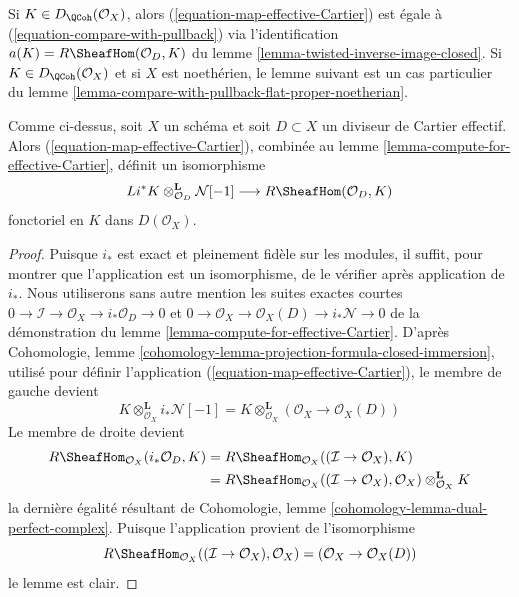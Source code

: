 \medskip\noindent
Si $K \in D_\QCoh(\mathcal{O}_X)$, alors (\ref{equation-map-effective-Cartier}) est égale à (\ref{equation-compare-with-pullback}) via l'identification $a(K) = R\SheafHom(\mathcal{O}_D, K)$ du lemme \ref{lemma-twisted-inverse-image-closed}. Si $K \in D_\QCoh(\mathcal{O}_X)$ et si $X$ est noethérien, le lemme suivant est un cas particulier du lemme \ref{lemma-compare-with-pullback-flat-proper-noetherian}.

\begin{lemma}
\label{lemma-sheaf-with-exact-support-effective-Cartier}
Comme ci-dessus, soit $X$ un schéma et soit $D \subset X$ un diviseur de Cartier effectif. Alors (\ref{equation-map-effective-Cartier}), combinée au lemme \ref{lemma-compute-for-effective-Cartier}, définit un isomorphisme
$$
Li^*K \otimes_{\mathcal{O}_D}^\mathbf{L} \mathcal{N}[-1]
\longrightarrow
R\SheafHom(\mathcal{O}_D, K)
$$
fonctoriel en $K$ dans $D(\mathcal{O}_X)$.
\end{lemma}

\begin{proof}
Puisque $i_*$ est exact et pleinement fidèle sur les modules, il suffit, pour montrer que l'application est un isomorphisme, de le vérifier après application de $i_*$. Nous utiliserons sans autre mention les suites exactes courtes
$0 \to \mathcal{I} \to \mathcal{O}_X \to i_*\mathcal{O}_D \to 0$
et
$0 \to \mathcal{O}_X \to \mathcal{O}_X(D) \to i_*\mathcal{N} \to 0$
de la démonstration du lemme \ref{lemma-compute-for-effective-Cartier}. D'après Cohomologie, lemme \ref{cohomology-lemma-projection-formula-closed-immersion}, utilisé pour définir l'application (\ref{equation-map-effective-Cartier}), le membre de gauche devient
$$
K \otimes_{\mathcal{O}_X}^\mathbf{L} i_*\mathcal{N}[-1] =
K \otimes_{\mathcal{O}_X}^\mathbf{L} (\mathcal{O}_X \to \mathcal{O}_X(D))
$$
Le membre de droite devient
\begin{align*}
R\SheafHom_{\mathcal{O}_X}(i_*\mathcal{O}_D, K) & =
R\SheafHom_{\mathcal{O}_X}((\mathcal{I} \to \mathcal{O}_X), K) \\
& =
R\SheafHom_{\mathcal{O}_X}((\mathcal{I} \to \mathcal{O}_X), \mathcal{O}_X)
\otimes_{\mathcal{O}_X}^\mathbf{L} K
\end{align*}
la dernière égalité résultant de Cohomologie, lemme \ref{cohomology-lemma-dual-perfect-complex}. Puisque l'application provient de l'isomorphisme
$$
R\SheafHom_{\mathcal{O}_X}((\mathcal{I} \to \mathcal{O}_X), \mathcal{O}_X)
= (\mathcal{O}_X \to \mathcal{O}_X(D))
$$
le lemme est clair.
\end{proof}





